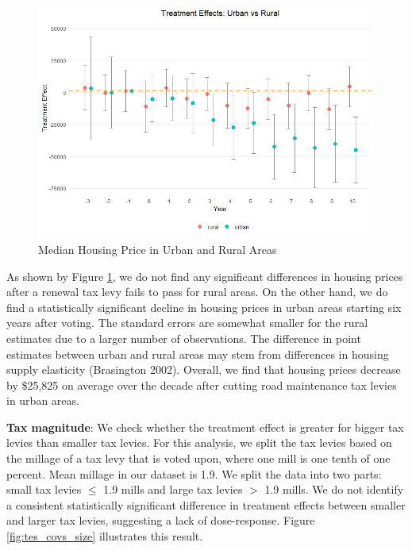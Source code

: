 \begin{figure}[htbp]
    \centering
    \includegraphics[width=\textwidth,keepaspectratio]{images/tes_covs_ua_re.png}        
    \caption{Median Housing Price in Urban and Rural Areas}
    \label{fig:tes_covs_ua}
\end{figure}

As shown by Figure \ref{fig:tes_covs_ua}, we do not find any significant differences in housing prices after a renewal tax levy fails to pass for rural areas. On the other hand, we do find a statistically significant decline in housing prices in urban areas starting six years after voting. The standard errors are somewhat smaller for the rural estimates due to a larger number of observations. The difference in point estimates between urban and rural areas may stem from differences in housing supply elasticity (Brasington 2002). Overall, we find that housing prices decrease by \$25,825 on average over the decade after cutting road maintenance tax levies in urban areas. 

\vskip 1cm

\textbf{Tax magnitude}: We check whether the treatment effect is greater for bigger tax levies than smaller tax levies. For this analysis, we split the tax levies based on the millage of a tax levy that is voted upon, where one mill is one tenth of one percent. Mean millage in our dataset is 1.9. We split the data into two parts: small tax levies $\le$ 1.9 mills and large tax levies $>$ 1.9 mills. We do not identify a consistent statistically significant difference in treatment effects between smaller and larger tax levies, suggesting a lack of dose-response. Figure \ref{fig:tes_covs_size} illustrates this result.

